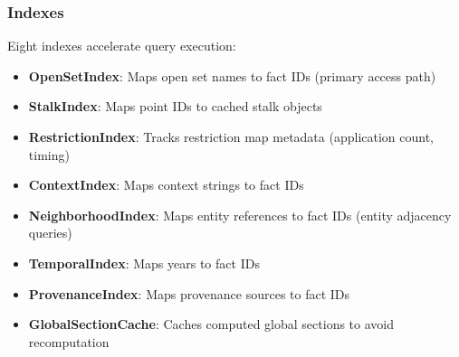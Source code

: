 \subsubsection{Indexes}

Eight indexes accelerate query execution:

\begin{itemize}
    \item \textbf{OpenSetIndex}: Maps open set names to fact IDs (primary access path)
    \item \textbf{StalkIndex}: Maps point IDs to cached stalk objects
    \item \textbf{RestrictionIndex}: Tracks restriction map metadata (application count, timing)
    \item \textbf{ContextIndex}: Maps context strings to fact IDs
    \item \textbf{NeighborhoodIndex}: Maps entity references to fact IDs (entity adjacency queries)
    \item \textbf{TemporalIndex}: Maps years to fact IDs
    \item \textbf{ProvenanceIndex}: Maps provenance sources to fact IDs
    \item \textbf{GlobalSectionCache}: Caches computed global sections to avoid recomputation
\end{itemize}
\endinput
